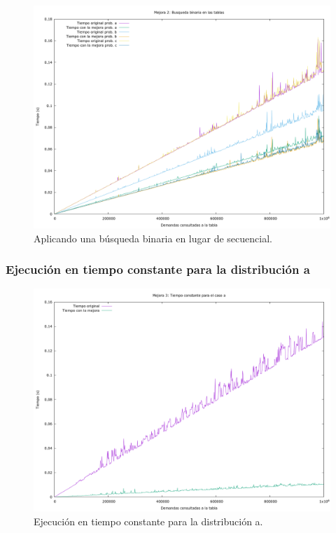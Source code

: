 \documentclass[12pt, spanish]{article}
\begin{document}
\begin{figure}[H]
	\centering
	\includegraphics[scale = 0.3]{t_mejora2.png}
	\caption{Aplicando una búsqueda binaria en lugar de secuencial.}
	\label{fig:ej1_a_150000}

\end{figure}

\subsubsection{Ejecución en tiempo constante para la distribución a}


\begin{figure}[H]
	\centering
	\includegraphics[scale = 0.3]{t_mejora3.png}
	\caption{Ejecución en tiempo constante para la distribución a.}
	\label{fig:ej1_a_150000}

\end{figure}
\end{document}
